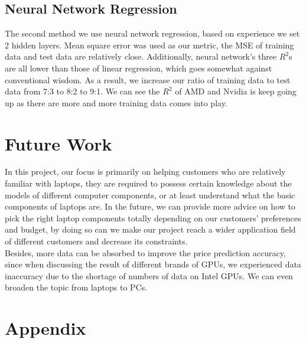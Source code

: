 \documentclass{scrartcl}
\begin{document}
\subsection{Neural Network Regression}
The second method we use neural network regression, based on experience we set 2 hidden layers. Mean square error was used as our metric, the MSE of training data and test data are relatively close. Additionally, neural network's three $R^2$s are all lower than those of linear regression, which goes somewhat against conventional wisdom. As a result, we increase our ratio of training data to test data from 7:3 to 8:2 to 9:1. We can see the $R^2$ of AMD and Nvidia is keep going up as there are more and more training data comes into play.\\






\section{Future Work}

In this project, our focus is primarily on helping customers who are relatively familiar with laptops, they are required to possess certain knowledge about the models of different computer components, or at least understand what the basic components of laptops are. In the future, we can provide more advice on how to pick the right laptop components totally depending on our customers' preferences and budget, by doing so can we make our project reach a wider application field of different customers and decrease its constraints.\\
Besides, more data can be absorbed to improve the price prediction accuracy, since when discussing the result of different brands of GPUs, we experienced data inaccuracy due to the shortage of numbers of data on Intel GPUs. We can even broaden the topic from laptops to PCs.\\


\newpage
\singlespacing




\newpage
\appendix
\section{Appendix}

\begin{lstlisting}[language=Python,  basicstyle=\tiny,]


\end{lstlisting}
\end{document}
